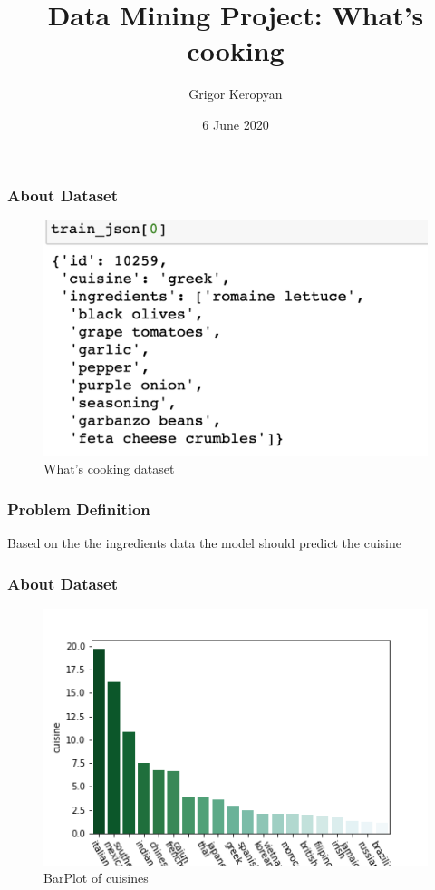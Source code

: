 \documentclass{beamer}
\title{Data Mining Project: What's cooking}
\author[Grigor] %
{Grigor Keropyan\inst{1}}
\institute[YSU] %
{
	\inst{1}%
	Department of Mathematics and Mechanics\\
	Yerevan State University
}
\date[2020] %
{6 June 2020}
\begin{document}
\frame{\titlepage}

\begin{frame}
\frametitle{About Dataset}

\begin{figure}

	\centering
	\includegraphics[width=1.1\linewidth, height=0.7\textheight, keepaspectratio]{dataset.png}
	\caption{What's cooking dataset}
	\label{fig:dataset}

\end{figure}

\end{frame}

\begin{frame}
\frametitle{Problem Definition}
	
Based on the the ingredients data the model should predict the cuisine

\end{frame}

\begin{frame}
\frametitle{About Dataset}

\begin{figure}

	\centering
	\includegraphics[width=1.1\linewidth, height=0.7\textheight, keepaspectratio]{../barplot.png}
	\caption{BarPlot of cuisines}
	\label{fig:barplot}

\end{figure}

\end{frame}
\end{document}

